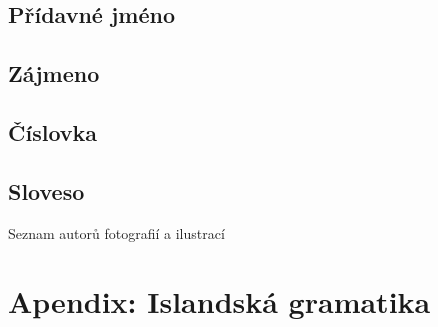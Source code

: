 \section{Přídavné jméno}                         \label{sec:morpho_adj}
{\small{}}


\section{Zájmeno}                                \label{sec:morpho_pron}


\section{Číslovka}                               \label{sec:morpho_num}
{\small{}}

\section{Sloveso}                                \label{sec:morpho_v}



\twocolumn
\pagestyle{empty}

\cleardoublepage
{}
{}
  {Seznam autorů fotografií a ilustrací}         \label{sec:photo}

\cleardoublepage
{}
{}
\nocite{*}

\onecolumn
\chapter{Apendix: Islandská gramatika}
%



\cleardoublepage\null\clearpage %
\makecover\backcoverimages


